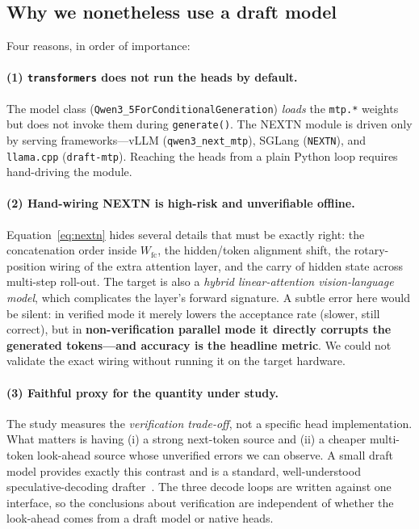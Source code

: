 \documentclass[11pt]{article}
\begin{document}
\subsection{Why we nonetheless use a draft model}
Four reasons, in order of importance:

\paragraph{(1) \texttt{transformers} does not run the heads by default.}
The model class (\texttt{Qwen3\_5ForConditionalGeneration}) \emph{loads} the
\texttt{mtp.*} weights but does not invoke them during \texttt{generate()}. The
NEXTN module is driven only by serving frameworks---vLLM
(\texttt{qwen3\_next\_mtp}), SGLang (\texttt{NEXTN}), and \texttt{llama.cpp}
(\texttt{draft-mtp}). Reaching the heads from a plain Python loop requires
hand-driving the module.

\paragraph{(2) Hand-wiring NEXTN is high-risk and unverifiable offline.}
Equation~\eqref{eq:nextn} hides several details that must be exactly right: the
concatenation order inside $W_{\text{fc}}$, the hidden/token alignment shift,
the rotary-position wiring of the extra attention layer, and the carry of hidden
state across multi-step roll-out. The target is also a \emph{hybrid linear-attention
vision-language model}, which complicates the layer's forward signature. A
subtle error here would be silent: in verified mode it merely lowers the
acceptance rate (slower, still correct), but in \textbf{non-verification
parallel mode it directly corrupts the generated tokens---and accuracy is the
headline metric}. We could not validate the exact wiring without running it on
the target hardware.

\paragraph{(3) Faithful proxy for the quantity under study.}
The study measures the \emph{verification trade-off}, not a specific head
implementation. What matters is having (i) a strong next-token source and (ii) a
cheaper multi-token look-ahead source whose unverified errors we can observe. A
small draft model provides exactly this contrast and is a standard, well-understood
speculative-decoding drafter~\cite{leviathan2023,chen2023}. The three decode
loops are written against one interface, so the conclusions about
verification are independent of whether the look-ahead comes from a draft model
or native heads.
\end{document}
